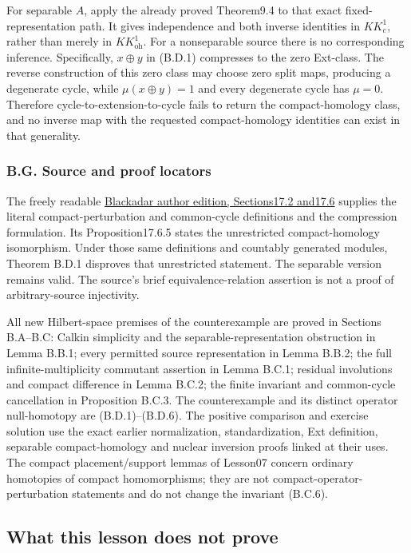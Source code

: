\documentclass[
  11pt,
]{article}
\begin{document}
For separable \(A\), apply the already proved Theorem9.4 to that exact
fixed-representation path. It gives independence and both inverse
identities in \(KK_c^1\), rather than merely in \(KK_{\mathrm{oh}}^1\).
For a nonseparable source there is no corresponding inference.
Specifically, \(x\oplus y\) in (B.D.1) compresses to the zero Ext-class.
The reverse construction of this zero class may choose zero split maps,
producing a degenerate cycle, while \(\mu(x\oplus y)=1\) and every
degenerate cycle has \(\mu=0\). Therefore cycle-to-extension-to-cycle
fails to return the compact-homology class, and no inverse map with the
requested compact-homology identities can exist in that generality.

\subsubsection{B.G. Source and proof
locators}\label{b.g.-source-and-proof-locators}

The freely readable
\href{https://www.bruceblackadar.com/Mathematics/book6.pdf}{Blackadar
author edition, Sections17.2 and17.6} supplies the literal
compact-perturbation and common-cycle definitions and the compression
formulation. Its Proposition17.6.5 states the unrestricted
compact-homology isomorphism. Under those same definitions and countably
generated modules, Theorem B.D.1 disproves that unrestricted statement.
The separable version remains valid. The source's brief
equivalence-relation assertion is not a proof of arbitrary-source
injectivity.

All new Hilbert-space premises of the counterexample are proved in
Sections B.A--B.C: Calkin simplicity and the separable-representation
obstruction in Lemma B.B.1; every permitted source representation in
Lemma B.B.2; the full infinite-multiplicity commutant assertion in Lemma
B.C.1; residual involutions and compact difference in Lemma B.C.2; the
finite invariant and common-cycle cancellation in Proposition B.C.3. The
counterexample and its distinct operator null-homotopy are
(B.D.1)--(B.D.6). The positive comparison and exercise solution use the
exact earlier normalization, standardization, Ext definition, separable
compact-homology and nuclear inversion proofs linked at their uses. The
compact placement/support lemmas of Lesson07 concern ordinary homotopies
of compact homomorphisms; they are not compact-operator-perturbation
statements and do not change the invariant (B.C.6).

\subsection{What this lesson does not
prove}\label{what-this-lesson-does-not-prove}
\end{document}

